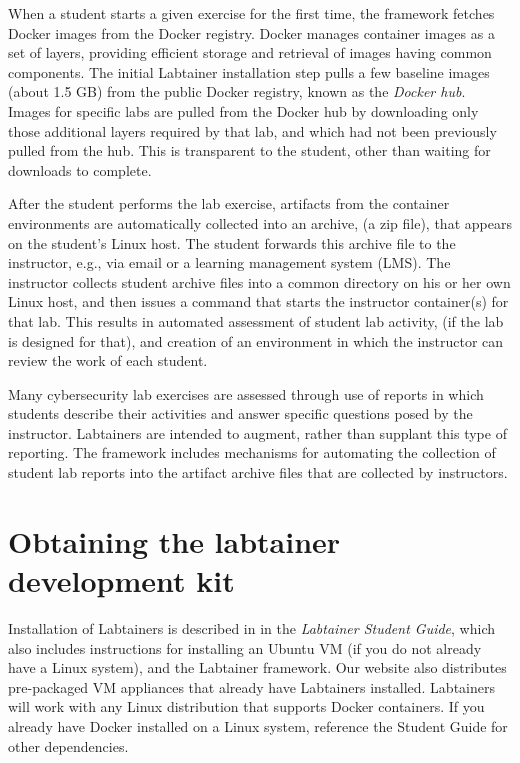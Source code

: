 \documentclass[12pt]{article}
\begin{document}
When a student starts a given exercise for the first time, the framework fetches
Docker images from the Docker registry.  Docker manages container images as a set of
layers, providing efficient storage and retrieval of images having common components.
The initial Labtainer installation step pulls a few baseline images (about 1.5 GB) from 
the public
Docker registry, known as the \textit{Docker hub}.  Images for specific labs are pulled
from the Docker hub by downloading only those additional layers required by that lab, and
which had not been previously pulled from the hub.  This is transparent to
the student, other than waiting for downloads to complete.

After the student performs the lab exercise, artifacts from the container
environments are automatically collected into an archive, (a zip file), that appears on
the student's Linux host.  The student forwards this archive file to the instructor,
e.g., via email or a learning management system (LMS).  The instructor collects student archive files into a common
directory on his or her own Linux host, and then issues a command that starts
the instructor container(s) for that lab.  This results in automated assessment of student lab
activity, (if the lab is designed for that), and creation of an environment
in which the instructor can review the work of each student.

Many cybersecurity lab exercises are assessed through use of reports in which students
describe their activities and answer specific questions posed by the instructor.  Labtainers
are intended to augment, rather than supplant this type of reporting.  The framework includes
mechanisms for automating the collection of student lab reports into the artifact archive files
that are collected by instructors. 

\section {Obtaining the labtainer development kit}
Installation of Labtainers is described in in the \textit{Labtainer Student Guide},  
which also includes instructions for installing an Ubuntu VM (if you do not already have a Linux system),
and the Labtainer framework.  Our website also distributes pre-packaged VM appliances that already have
Labtainers installed. Labtainers will work with any Linux
distribution that supports Docker containers.  If you already have Docker installed on a Linux system, 
reference the Student Guide for other dependencies. 
\end{document}
